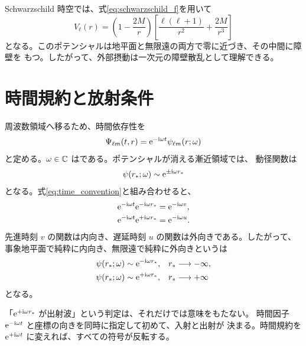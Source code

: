 Schwarzschild 時空では、式\eqref{eq:schwarzschild_f}を用いて
\begin{equation}
V_\ell(r)
=
\left(1-\frac{2M}{r}\right)
\left[
\frac{\ell(\ell+1)}{r^2}
+\frac{2M}{r^3}
\right]
\label{eq:schwarzschild_scalar_potential}
\end{equation}
となる。このポテンシャルは地平面と無限遠の両方で零に近づき、その中間に障壁を
もつ。したがって、外部摂動は一次元の障壁散乱として理解できる。

\section{時間規約と放射条件}

周波数領域へ移るため、時間依存性を
\begin{equation}
\Psi_{\ell m}(t,r)
=
\mathrm{e}^{-\mathrm{i}\omega t}\psi_{\ell m}(r;\omega)
\label{eq:time_convention}
\end{equation}
と定める。$\omega\in\mathbb{C}$ はである。ポテンシャルが消える漸近領域では、
動径関数は
\begin{equation}
\psi(r_*;\omega)
\sim
\mathrm{e}^{\mathord{\pm}\mathrm{i}\omega r_*}
\label{eq:asymptotic_plane_waves}
\end{equation}
となる。式\eqref{eq:time_convention}と組み合わせると、
\begin{align}
\mathrm{e}^{-\mathrm{i}\omega t}\mathrm{e}^{-\mathrm{i}\omega r_*}
&=
\mathrm{e}^{-\mathrm{i}\omega v},
\label{eq:ingoing_wave}
\\
\mathrm{e}^{-\mathrm{i}\omega t}\mathrm{e}^{+\mathrm{i}\omega r_*}
&=
\mathrm{e}^{-\mathrm{i}\omega u}.
\label{eq:outgoing_wave}
\end{align}
先進時刻 $v$ の関数は内向き、遅延時刻 $u$ の関数は外向きである。したがって、
事象地平面で純粋に内向き、無限遠で純粋に外向きというは
\begin{align}
\psi(r_*;\omega)
&\sim
\mathrm{e}^{-\mathrm{i}\omega r_*},
&& r_*\longrightarrow-\infty,
\label{eq:bh_ingoing_bc}
\\
\psi(r_*;\omega)
&\sim
\mathrm{e}^{+\mathrm{i}\omega r_*},
&& r_*\longrightarrow+\infty
\label{eq:infinity_outgoing_bc}
\end{align}
となる。

\begin{warningbox}
「$\mathrm{e}^{+\mathrm{i}\omega r_*}$ が出射波」という判定は、それだけでは意味をもたない。
時間因子 $\mathrm{e}^{-\mathrm{i}\omega t}$ と座標の向きを同時に指定して初めて、入射と出射が
決まる。時間規約を $\mathrm{e}^{+\mathrm{i}\omega t}$ に変えれば、すべての符号が反転する。
\end{warningbox}

